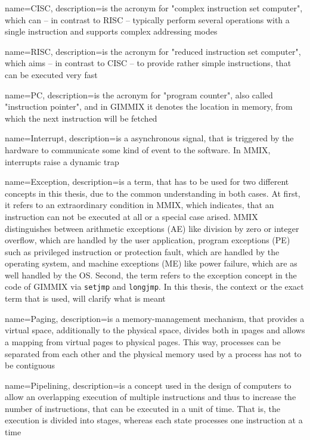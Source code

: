 {
	name={CISC},
	description={is the acronym for "complex instruction set computer", which can -- in contrast to \gls{RISC} -- typically perform several operations with a single instruction and supports complex addressing modes \citep{glcisc}}
}

{
	name={RISC},
	description={is the acronym for "reduced instruction set computer", which aims -- in contrast to \gls{CISC} -- to provide rather simple instructions, that can be executed very fast \citep{glrisc}}
}

{
	name={PC},
	description={is the acronym for "program counter", also called "instruction pointer", and in GIMMIX it denotes the location in memory, from which the next instruction will be fetched}
}

{
	name={Interrupt},
	description={is a asynchronous signal, that is triggered by the hardware to communicate some kind of event to the software. In MMIX, interrupts raise a dynamic trap}
}

{
	name={Exception},
	description={is a term, that has to be used for two different concepts in this thesis, due to the common understanding in both cases. At first, it refers to an extraordinary condition in MMIX, which indicates, that an instruction can not be executed at all or a special case arised. MMIX distinguishes between arithmetic exceptions (AE) like division by zero or integer overflow, which are handled by the user application, program exceptions (PE) such as privileged instruction or protection fault, which are handled by the operating system, and machine exceptions (ME) like power failure, which are as well handled by the OS. Second, the term refers to the exception concept in the code of GIMMIX via {\tt setjmp} and {\tt longjmp}. In this thesis, the context or the exact term that is used, will clarify what is meant}
}

{
	name={Paging},
	description={is a memory-management mechanism, that provides a virtual space, additionally to the physical space, divides both in \i{pages} and allows a mapping from virtual pages to physical pages. This way, processes can be separated from each other and the physical memory used by a process has not to be contiguous}
}

{
	name={Pipelining},
	description={is a concept used in the design of computers to allow an overlapping execution of multiple instructions and thus to increase the number of instructions, that can be executed in a unit of time. That is, the execution is divided into stages, whereas each state processes one instruction at a time \citep{glpipe}}
}

